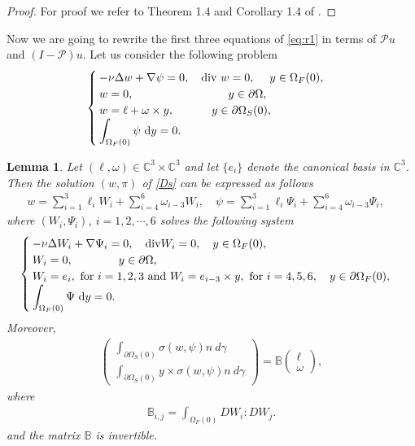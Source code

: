 \documentclass[12pt,a4paper,reqno]{amsart}
\newtheorem{lemma}[theorem]{Lemma}
\theoremstyle{definition}
\theoremstyle{remark}
\numberwithin{equation}{section}
\newcommand{\oso}{\Omega_{S}(0)}
\newcommand{\ofo}{\Omega_{F}(0)}
\newcommand{\ct}{\mathbb{C}^{3}}
\newcommand{\ds}{\displaystyle}
\newcommand{\mpp}{\mathcal{P}}
\begin{document}
\begin{proof}
For proof we refer to Theorem 1.4 and Corollary 1.4 of \cite{Gei10}.
\end{proof}



Now we are going to rewrite the first three equations of \eqref{eq:r1} in terms of $\mpp u$ and $(I - \mpp)u.$ Let us consider the  following problem
\begin{align} \label{Ds}
\begin{cases}
- \nu \Delta w + \nabla \psi = 0, \quad \mathrm{div} \ w = 0, \; \quad y \in \ofo,  \\
 w = 0, \;\qquad\qquad \qquad\qquad y \in \partial\Omega, \\
   w = \ell + \omega \times y, \; \qquad \quad  y \in  \partial\oso, \\
 \ds \int_{\ofo} \psi \ {\rm d}y = 0.
\end{cases}
\end{align}
\begin{lemma} \label{lem:lift}
Let $(\ell, \omega) \in \ct \times \ct$ and let $\{e_{i}\}$ denote the canonical basis in $\ct$. Then the solution $(w,\pi)$ of \eqref{Ds} can be expressed as follows
 \begin{align}
 w = \sum_{i=1}^{3} \ell_{i} W_{i} + \sum_{i=4}^{6} \omega_{i-3} W_{i},  \quad \psi = \sum_{i=1}^{3} \ell_{i} \Psi_{i} + \sum_{i=4}^{6} \omega_{i-3} \Psi_{i}, \quad
\end{align}
where  $(W_{i},\Psi_{i})$, $i = 1, 2, \cdots, 6$ solves the following system
\begin{align} \label{eq:UP}
\begin{cases}
-\nu \Delta W_{i} +  \nabla \Psi_{i} = 0, \quad \mathrm{div} W_{i} = 0, \quad y\in  \ofo,  \\
 W_{i} = 0, \qquad  \qquad y \in  \partial\Omega, \\
 W_{i} = e_{i}, \mbox{ for } i=1,2,3 \mbox{ and }  W_{i} = e_{i-3} \times y, \mbox{ for } i=4,5,6, \quad y\in \partial\ofo, \\
\ds  \ds \int_{\ofo} \Psi \ {\rm d}y = 0.
\end{cases}
\end{align}
Moreover,
\begin{align*}
\begin{pmatrix}
\displaystyle
\int_{\partial\oso} \sigma(w,\psi)n \  d\gamma \\ \displaystyle \int_{\partial\oso} y \times \sigma (w, \psi)n \  d\gamma
\end{pmatrix} = \mathbb{B} \begin{pmatrix}
\ell \\ \omega
\end{pmatrix},
\end{align*}
where
\begin{align} \label{matM1}
\displaystyle \mathbb {B}_{i,j} = \int_{\ofo} DW_{i} : DW_{j}.
\end{align}
and the matrix $\mathbb{B}$ is invertible.
\end{lemma}
\end{document}
